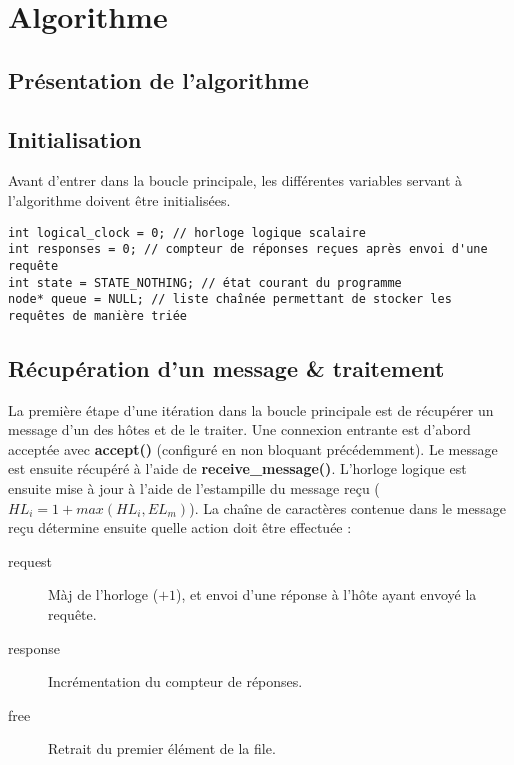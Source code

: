 \section{Algorithme}
\subsection{Présentation de l'algorithme}


\subsection{Initialisation}
Avant d'entrer dans la boucle principale, les différentes variables servant à l'algorithme doivent être initialisées.

\begin{lstlisting}
int logical_clock = 0; // horloge logique scalaire
int responses = 0; // compteur de réponses reçues après envoi d'une requête
int state = STATE_NOTHING; // état courant du programme
node* queue = NULL; // liste chaînée permettant de stocker les requêtes de manière triée
\end{lstlisting}

\subsection{Récupération d'un message \& traitement}
La première étape d'une itération dans la boucle principale est de récupérer un message d'un des hôtes et de le traiter.  Une connexion entrante est d'abord acceptée avec \textbf{accept()} (configuré en non bloquant précédemment). Le message est ensuite récupéré à l'aide de \textbf{receive\_message()}. L'horloge logique est ensuite mise à jour à l'aide de l'estampille du message reçu ($HL_i = 1 + max(HL_i, EL_m)$). La chaîne de caractères contenue dans le message reçu détermine ensuite quelle action doit être effectuée :

\begin{description}
    \item[request] Màj de l'horloge ($+1$), et envoi d'une réponse à l'hôte ayant envoyé la requête.
    \item[response] Incrémentation du compteur de réponses.
    \item[free] Retrait du premier élément de la file.
\end{description}

